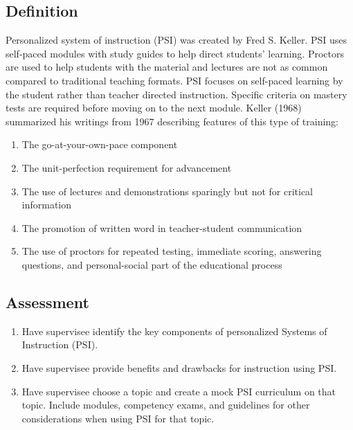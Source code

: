 \subsection{Definition}
Personalized system of instruction (PSI) was created by Fred S. Keller.  PSI uses self-paced modules with study guides to help direct students' learning. Proctors are used to help students with the material and lectures are not as common compared to traditional teaching formats. PSI focuses on self-paced learning by the student rather than teacher directed instruction. Specific criteria on mastery tests are required before moving on to the next module. Keller (1968) summarized his writings from 1967 describing features of this type of training: 
\begin{enumerate}
\item The go-at-your-own-pace component
\item The unit-perfection requirement for advancement
\item The use of lectures and demonstrations sparingly but not for critical information
\item The promotion of written word in teacher-student communication
\item The use of proctors for repeated testing, immediate scoring, answering questions, and personal-social part of the educational process
\end{enumerate}
%
\subsection{Assessment}
\begin{enumerate}
\item Have supervisee identify the key components of personalized Systems of Instruction (PSI).
\item Have supervisee provide benefits and drawbacks for instruction using PSI.
\item Have supervisee choose a topic and create a mock PSI curriculum on that topic. Include modules, competency exams, and guidelines for other considerations when using PSI for that topic. 
%
\end{enumerate}
%
